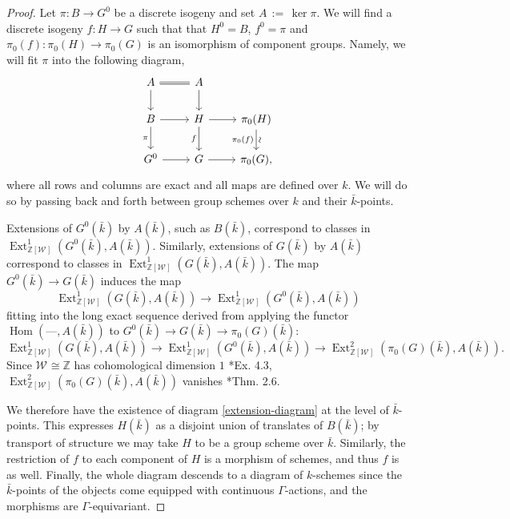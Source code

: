 \documentclass{amsart}
\theoremstyle{plain}
\theoremstyle{definition}
\theoremstyle{remark}
\newcommand{\ZZ}{{\mathbb{Z}}}
\newcommand{\bFq}{\bar{k}}
\newcommand{\Fq}{k}
\newcommand{\Weil}[1]{\mathcal{W}_{#1}}
\DeclareMathOperator{\Hom}{Hom}
\DeclareMathOperator{\Ext}{Ext}
\newcommand{\ceq}{{\, :=\, }}
\begin{document}
\begin{proof}
Let $\pi: B \to G^0$ be a discrete isogeny and set $A \ceq \ker \pi$.
  We will find a discrete isogeny $f: H\to G$
  such that that $H^0 = B$, $f^0 =\pi$ and
  $\pi_0(f) : \pi_0(H)\to \pi_0(G)$ is an isomorphism of component
  groups.  Namely, we will fit $\pi$ into the following diagram,
  \begin{equation}\label{extension-diagram}
  \begin{tikzcd}
  A \arrow[equal]{r} \dar & A \dar \\
  B \rar \dar[swap]{\pi} & H \rar \dar[swap]{f} & \pi_0(H) \arrow{d}[below,rotate=90]{\sim}[swap]{\pi_0(f)} \\
  G^0 \rar & G \rar & \pi_0(G),
  \end{tikzcd}
  \end{equation}
  where all rows and columns are exact and all maps are defined over
  $\Fq$.  We will do so by passing back and forth between group
  schemes over $\Fq$ and their $\bFq$-points.

  Extensions of $G^0(\bFq)$ by $A(\bFq)$, such as $B(\bFq)$,
  correspond to classes in $\Ext^1_{\ZZ[\Weil{}]}(G^0(\bFq), A(\bFq))$.
  Similarly, extensions of $G(\bFq)$ by $A(\bFq)$ correspond to
  classes in $\Ext^1_{\ZZ[\Weil{}]}(G(\bFq), A(\bFq))$.  The map
  $G^0(\bFq) \to G(\bFq)$ induces the map
  \[
  \Ext^1_{\ZZ[\Weil{}]}(G(\bFq), A(\bFq)) \to \Ext^1_{\ZZ[\Weil{}]}(G^0(\bFq), A(\bFq))
  \]
  fitting into the long exact sequence derived from applying
  the functor $\Hom(\mbox{---}, A(\bFq))$ to $G^0(\bFq) \to G(\bFq) \to \pi_0(G)(\bFq)$:
  \[
  \Ext^1_{\ZZ[\Weil{}]}(G(\bFq), A(\bFq)) \to \Ext^1_{\ZZ[\Weil{}]}(G^0(\bFq), A(\bFq)) \to \Ext^2_{\ZZ[\Weil{}]}(\pi_0(G)(\bFq), A(\bFq)).
  \]
  Since $\Weil{} \cong \ZZ$ has cohomological dimension $1$ \cite{brown:CohomologyGrps}*{Ex. 4.3},
  $\Ext^2_{\ZZ[\Weil{}]}(\pi_0(G)(\bFq), A(\bFq))$ vanishes \cite{cartan-eilenberg:HomologicalAlgebra}*{Thm. 2.6}.

  We therefore have the existence of diagram \eqref{extension-diagram}
  at the level of $\bFq$-points.  This expresses $H(\bFq)$ as a
  disjoint union of translates of $B(\bFq)$; by transport of structure
  we may take $H$ to be a group scheme over $\bFq$.  Similarly, the
  restriction of $f$ to each component of $H$ is a morphism of
  schemes, and thus $f$ is as well.  Finally, the whole diagram
  descends to a diagram of $\Fq$-schemes since the $\bFq$-points of
  the objects come equipped with continuous $\Gamma$-actions, and the
  morphisms are $\Gamma$-equivariant.
\end{proof}
\end{document}
